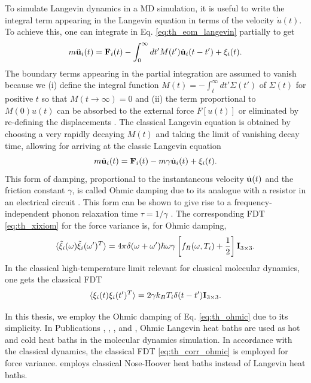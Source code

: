 To simulate Langevin dynamics in a MD simulation, it is useful to write the integral term appearing in the Langevin equation in terms of the velocity $\dot{u}(t)$. To achieve this, one can integrate in Eq. \eqref{eq:th_eom_langevin} partially to get
\begin{equation}
 m\ddot{\mathbf{u}}_i(t) =  \mathbf{F}_i(t) - \int_{0}^{\infty}dt' M(t')\dot{\mathbf{u}}_i(t-t') + \xi_i(t). \label{eq:th_langevin_Mt}
\end{equation}
The boundary terms appearing in the partial integration are assumed to vanish because we (i) define the integral function $M(t)=-\int_t^{\infty} dt' \Sigma(t')$ of $\Sigma(t)$ for positive $t$ so that $M(t\to \infty)=0$ and (ii) the term proportional to $M(0)u(t)$ can be absorbed to the external force $F[u(t)]$ or eliminated by re-defining the displacements \cite{weiss}. The classical Langevin equation is obtained by choosing a very rapidly decaying $M(t)$ and taking the limit of vanishing decay time, allowing for arriving at the classic Langevin equation \cite{zwanzig}
\begin{equation}
 m\ddot{\mathbf{u}}_i(t) =  \mathbf{F}_i(t) - m\gamma \dot{\mathbf{u}}_i(t) + \xi_i(t). \label{eq:th_ohmic}
\end{equation}
This form of damping, proportional to the instantaneous velocity $\dot{\mathbf{u}}(t)$ and the friction constant $\gamma$, is called Ohmic damping due to its analogue with a resistor in an electrical circuit \cite{weiss}. This form can be shown to give rise to a frequency-independent phonon relaxation time $\tau=1/\gamma$ \cite{li09jap}. The corresponding FDT \eqref{eq:th_xixiom} for the force variance is, for Ohmic damping,
\begin{equation}
 \langle \tilde \xi_i(\omega) \tilde \xi_i(\omega')^T \rangle = 4\pi \delta(\omega+\omega') \hbar \omega \gamma \left[f_B(\omega,T_i)+ \frac{1}{2} \right] \mathbf{I}_{3\times 3}. \label{eq:th_xixiom_ohmic_qm}
\end{equation}
In the classical high-temperature limit relevant for classical molecular dynamics, one gets the classical FDT \cite{zwanzig}
\begin{equation}
 \langle \xi_i(t) \xi_i(t')^T\rangle=2\gamma k_B T_i \delta(t-t') \mathbf{I}_{3\times 3}. \label{eq:th_corr_ohmic} 
\end{equation}

In this thesis, we employ the Ohmic damping of Eq. \eqref{eq:th_ohmic} due to its simplicity. In Publications , , , and , Ohmic Langevin heat baths are used as hot and cold heat baths in the molecular dynamics simulation. In accordance with the classical dynamics, the classical FDT \eqref{eq:th_corr_ohmic} is employed for force variance.  employs classical Nose-Hoover heat baths \cite{hoover85} instead of Langevin heat baths. 


